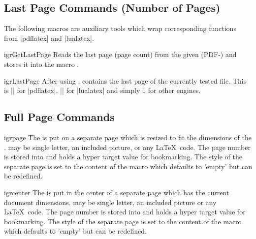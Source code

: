 \documentclass[a4paper,11pt]{ltxdoc}
\begin{document}
\subsection{Last Page Commands (Number of Pages)}

The following macros are auxiliary tools which wrap corresponding functions
from |pdflatex| and |lualatex|.

\begin{docCommand}[doc new=2021-10-18]{igrGetLastPage}{}
  Reads the last page (page count) from the given (PDF-)
  and stores it into the macro .
\end{docCommand}


\begin{docCommand}[doc new=2021-10-18]{igrLastPage}{}
  After using ,  contains
  the last page of the currently tested file.
  This is |\pdflastximagepages| for |pdflatex|,
  |\lastsavedimageresourcepages| for |lualatex| and simply $1$
  for other engines.
\end{docCommand}


\clearpage
\subsection{Full Page Commands}

\begin{docCommand}{igrpage}{}
  The  is put on a separate page which is resized to fit the
  dimensions of the .  may be single letter, an
  included picture, or any \LaTeX\ code.
  The page number is stored into  and
   holds a hyper target value for bookmarking.
  The style of the separate page is set to
  the content of the macro
   which defaults to 'empty' but can be
  redefined.
\end{docCommand}

\begin{docCommand}{igrcenter}{}
  The  is put in the center of a separate page which has the
  current document dimensions.  may be single letter, an
  included picture or any \LaTeX\ code.
  The page number is stored into  and
   holds a hyper target value for bookmarking.
  The style of the separate page is set to
  the content of the macro
   which defaults to 'empty' but can be
  redefined.
\end{docCommand}
\end{document}
